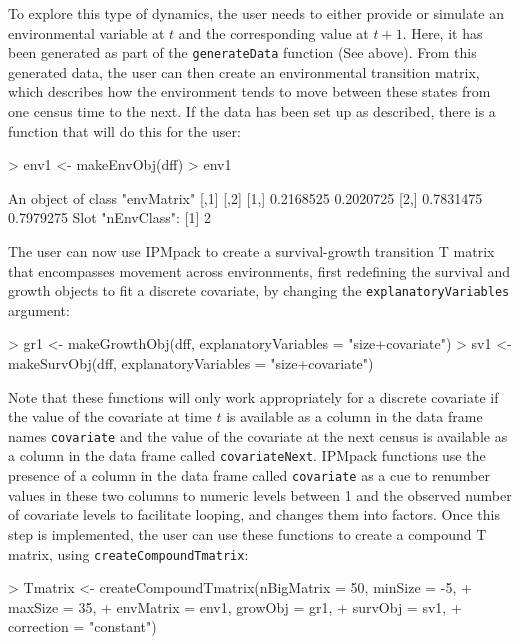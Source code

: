 \documentclass{article}
\begin{document}
To explore this type of dynamics, the user needs to either provide or simulate an environmental variable at $t$ and the corresponding value at $t+1$. Here, it has been generated as part of the {\tt generateData} function (See above). From this generated data, the user can then create an environmental transition matrix, which describes how the environment tends to move between these states from one census time to the next. If the data has been set up as described, there is a function that will do this for the user: 
\begin{Schunk}
\begin{Sinput}
> env1 <- makeEnvObj(dff) 
> env1
\end{Sinput}
\begin{Soutput}
An object of class "envMatrix"
          [,1]      [,2]
[1,] 0.2168525 0.2020725
[2,] 0.7831475 0.7979275
Slot "nEnvClass":
[1] 2
\end{Soutput}
\end{Schunk}
The user can now use IPMpack to create a survival-growth transition T matrix that encompasses movement across environments, first redefining the survival and growth
objects to fit a discrete covariate, by changing the {\tt explanatoryVariables} argument: 
\begin{Schunk}
\begin{Sinput}
> gr1 <- makeGrowthObj(dff, explanatoryVariables = "size+covariate")
> sv1 <- makeSurvObj(dff, explanatoryVariables = "size+covariate")
\end{Sinput}
\end{Schunk}
Note that these functions will only work appropriately for a discrete covariate if the value of the covariate at time $t$ is available as a column in the data frame names {\tt covariate} and the value of the covariate at the next census is available as a column in the data frame called {\tt covariateNext}. IPMpack functions use the presence of a column in the data frame called {\tt covariate} as a cue to renumber values in these two columns to numeric levels between 1 and the observed number of covariate levels to facilitate looping, and changes them into factors. Once this step is implemented, the user can use these functions to create a compound T matrix, using {\tt createCompoundTmatrix}: 
\begin{Schunk}
\begin{Sinput}
> Tmatrix <- createCompoundTmatrix(nBigMatrix = 50, minSize = -5, 
+                                  maxSize = 35, 
+                                  envMatrix = env1, growObj = gr1, 
+                                  survObj = sv1, 
+                                  correction = "constant")
\end{Sinput}
\end{Schunk}
\end{document}
